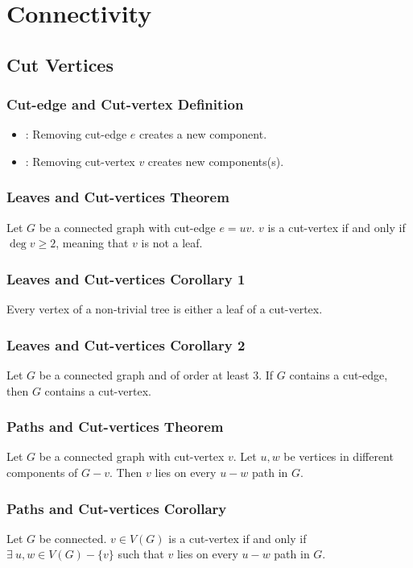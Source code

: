 \section{Connectivity}

\subsection{Cut Vertices}

\subsubsection*{Cut-edge and Cut-vertex Definition}
\begin{itemize}
    \item {}: Removing cut-edge $e$ creates a new component.
    \item {}: Removing cut-vertex $v$ creates new components(s).
\end{itemize}

\subsubsection*{Leaves and Cut-vertices Theorem}
Let $G$ be a connected graph with cut-edge $e=uv$. $v$ is a cut-vertex if and only if $\deg v \geq 2$, meaning that $v$ is not a leaf.

\subsubsection*{Leaves and Cut-vertices Corollary 1}
Every vertex of a non-trivial tree is either a leaf of a cut-vertex.

\subsubsection*{Leaves and Cut-vertices Corollary 2}
Let $G$ be a connected graph and of order at least 3. If $G$ contains a cut-edge, then $G$ contains a cut-vertex.

\subsubsection*{Paths and Cut-vertices Theorem}
Let $G$ be a connected graph with cut-vertex $v$. Let $u,w$ be vertices in different components of $G-v$. Then $v$ lies on every $u-w$ path in $G$.

\subsubsection*{Paths and Cut-vertices Corollary}
Let $G$ be connected. $v \in V(G)$ is a cut-vertex if and only if $\exists~ u,w \in V(G)-\{v\}$ such that $v$ lies on every $u-w$ path in $G$.


